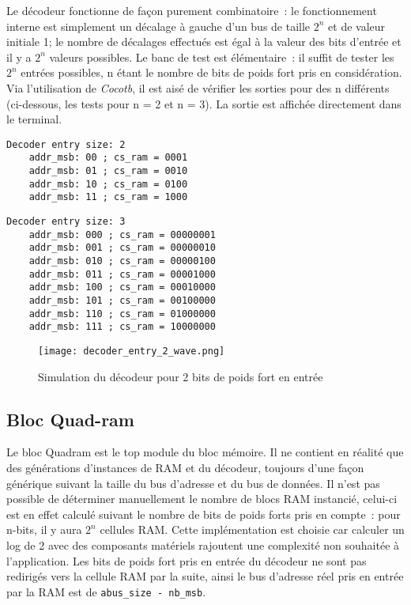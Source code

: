 \indent Le décodeur fonctionne de façon purement combinatoire : le fonctionnement interne est simplement un décalage à gauche d'un bus de taille $ 2^{n} $ et de valeur initiale 1; le nombre de décalages effectués est égal à la valeur des bits d'entrée et il y a $ 2^{n} $ valeurs possibles.
Le banc de test est élémentaire : il suffit de tester les $ 2^{n} $ entrées possibles, n étant le nombre de bits de poids fort pris en considération. Via l'utilisation de \textit{Cocotb}, il est aisé de vérifier les sorties pour des n différents (ci-dessous, les tests pour n = 2 et n = 3). La sortie est affichée directement dans le terminal.

\begin{lstlisting}[frame=single, basicstyle = \ttfamily \footnotesize]
	Decoder entry size: 2
	addr_msb: 00 ; cs_ram = 0001
	addr_msb: 01 ; cs_ram = 0010
	addr_msb: 10 ; cs_ram = 0100
	addr_msb: 11 ; cs_ram = 1000
\end{lstlisting}

\begin{lstlisting}[frame=single, basicstyle = \ttfamily \footnotesize]
	Decoder entry size: 3
	addr_msb: 000 ; cs_ram = 00000001
	addr_msb: 001 ; cs_ram = 00000010
	addr_msb: 010 ; cs_ram = 00000100
	addr_msb: 011 ; cs_ram = 00001000
	addr_msb: 100 ; cs_ram = 00010000
	addr_msb: 101 ; cs_ram = 00100000
	addr_msb: 110 ; cs_ram = 01000000
	addr_msb: 111 ; cs_ram = 10000000
\end{lstlisting}

\begin{figure}[h]
	\centering
	\texttt{[image: decoder\_entry\_2\_wave.png]}
	\caption{Simulation du décodeur pour 2 bits de poids fort en entrée}
	\label{fig:wave_bloc_decoder}
\end{figure}

\newpage

\subsection{Bloc Quad-ram}

\indent Le bloc Quadram est le top module du bloc mémoire.
Il ne contient en réalité que des générations d'instances de \gls{RAM} et du décodeur, toujours d'une façon générique suivant la taille du bus d'adresse et du bus de données.
Il n'est pas possible de déterminer manuellement le nombre de blocs \gls{RAM} instancié, celui-ci est en effet calculé suivant le nombre de bits de poids forts pris en compte : pour n-bits, il y aura $ 2^{n} $ cellules \gls{RAM}.
Cette implémentation est choisie car calculer un log de 2 avec des composants matériels rajoutent une complexité non souhaitée à l'application.
Les bits de poids fort pris en entrée du décodeur ne sont pas redirigés vers la cellule \gls{RAM} par la suite, ainsi le bus d'adresse réel pris en entrée par la \gls{RAM} est de \texttt{abus\_size - nb\_msb}.

